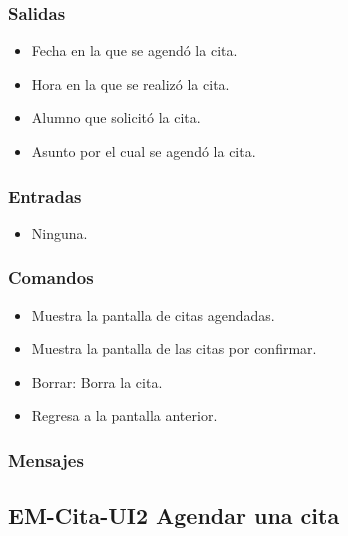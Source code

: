 
\subsubsection{Salidas}
	\begin{itemize}
		\item Fecha en la que se agendó la cita.
		\item Hora en la que se realizó la cita.
		\item Alumno que solicitó la cita.
		\item Asunto por el cual se agendó la cita.
	\end{itemize}

\subsubsection{Entradas}

\begin{itemize}
	\item Ninguna.
\end{itemize}

\subsubsection{Comandos}
\begin{itemize}
	\item {} Muestra la pantalla de citas agendadas.
	\item {} Muestra la pantalla de las citas por confirmar.
	\item Borrar: Borra la cita.
	\item {} Regresa a la pantalla anterior.
\end{itemize}

\subsubsection{Mensajes}
\begin{Citemize}
	\item {}
\end{Citemize}


\pagebreak
\subsection{EM-Cita-UI2 Agendar una cita }

